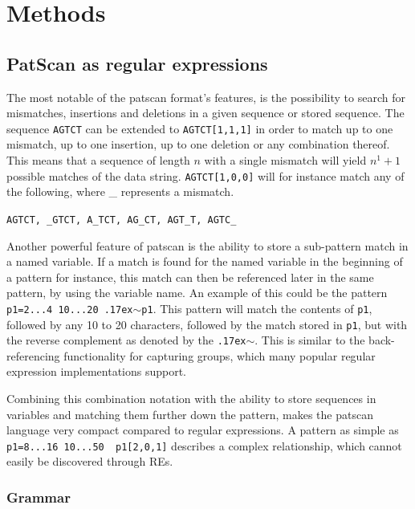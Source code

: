 \documentclass[12pt]{article}
\theoremstyle{definition}
\begin{document}
\newpage

\section{Methods}
\subsection{PatScan as regular expressions}

The most notable of the patscan format's features, is the possibility to search for mismatches, insertions and deletions in a given sequence or stored sequence. The sequence \texttt{AGTCT} can be extended to \texttt{AGTCT[1,1,1]} in order to match up to one mismatch, up to one insertion, up to one deletion or any combination thereof. This means that a sequence of length $n$ with a single mismatch will yield $n^1+1$ possible matches of the data string. \texttt{AGTCT[1,0,0]} will for instance match any of the following, where \_ represents a mismatch.

\texttt{AGTCT, \_GTCT, A\_TCT, AG\_CT, AGT\_T, AGTC\_}

Another powerful feature of patscan is the ability to store a sub-pattern match in a named variable. If a match is found for the named variable in the beginning of a pattern for instance, this match can then be referenced later in the same pattern, by using the variable name. An example of this could be the pattern \texttt{p1=2...4 10...20 {\raise.17ex\hbox{$\scriptstyle\mathtt{\sim}$}}p1}. This pattern will match the contents of \texttt{p1}, followed by any 10 to 20 characters, followed by the match stored in \texttt{p1}, but with the reverse complement as denoted by the \texttt{{\raise.17ex\hbox{$\scriptstyle\mathtt{\sim}$}}}. This is similar to the back-referencing functionality for capturing groups, which many popular regular expression implementations support.%

Combining this combination notation with the ability to store sequences in variables and matching them further down the pattern, makes the patscan language very compact compared to regular expressions. A pattern as simple as \texttt{p1=8...16 10...50 ~p1[2,0,1]} describes a complex relationship, which cannot easily be discovered through REs.

\subsubsection{Grammar}
\label{Patscan grammar}
\end{document}
